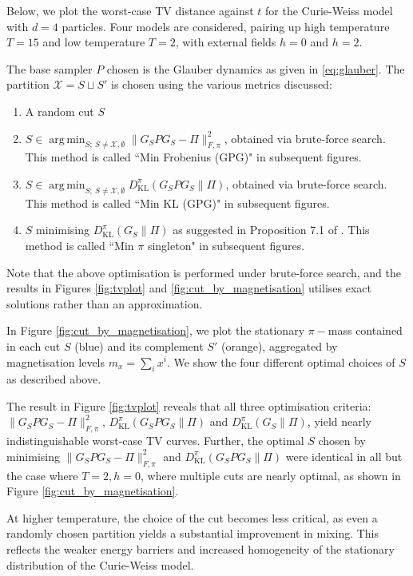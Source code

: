 \documentclass[EJP]{ejpecp} %
\DeclareMathOperator*{\argmin}{arg\,min}
\begin{document}
Below, we plot the worst-case TV distance against $t$ for the Curie-Weiss model with $d = 4$ particles. Four models are considered, pairing up high temperature $T = 15$ and low temperature $T = 2$, with external fields $h = 0$ and $h = 2$.

The base sampler $P$ chosen is the Glauber dynamics as given in \eqref{eq:glauber}. The partition $\mathcal{X} = S \sqcup S'$ is chosen using the various metrics discussed:
\begin{enumerate}
    \item A random cut $S$
    \item $S \in \argmin_{S;~S \neq \mathcal{X}, \emptyset} \|G_SPG_S - \Pi\|_{F, \pi}^2$, obtained via brute-force search. This method is called ``Min Frobenius (GPG)" in subsequent figures.
    \item $S \in \argmin_{S;~S \neq \mathcal{X}, \emptyset} D_{\mathrm{KL}}^\pi (G_SPG_S \| \Pi )$, obtained via brute-force search. This method is called ``Min KL (GPG)" in subsequent figures.
    \item $S$ minimising $D_{\mathrm{KL}}^\pi (G_S \| \Pi )$ as suggested in Proposition 7.1 of \cite{GPG}. This method is called ``Min $\pi$ singleton" in subsequent figures.
\end{enumerate}
Note that the above optimisation is performed under brute-force search, and the results in Figures \ref{fig:tvplot} and \ref{fig:cut_by_magnetisation} utilises exact solutions rather than an approximation. 

In Figure \ref{fig:cut_by_magnetisation}, we plot the stationary $\pi-$mass contained in each cut $S$ (blue) and its complement $S'$ (orange), aggregated by magnetisation levels $m_x = \sum_i x^i.$ We show the four different optimal choices of $S$ as described above.

The result in Figure \ref{fig:tvplot} reveals that all three optimisation criteria: $\|G_SPG_S - \Pi\|_{F, \pi}^2$, $D_{\mathrm{KL}}^\pi (G_SPG_S \| \Pi )$ and $D_{\mathrm{KL}}^\pi (G_S \| \Pi )$,
yield nearly indistinguishable worst-case TV curves. Further, the optimal $S$ chosen by minimising $\|G_SPG_S - \Pi\|_{F, \pi}^2$ and $D_{\mathrm{KL}}^\pi (G_SPG_S \| \Pi )$ were identical in all but the case where $T = 2, h = 0$, where multiple cuts are nearly optimal, as shown in Figure \ref{fig:cut_by_magnetisation}. 

At higher temperature, the choice of the cut becomes less critical, as even a randomly chosen partition yields a substantial improvement in mixing. This reflects the weaker energy barriers and increased homogeneity of the stationary distribution of the Curie-Weiss model.
\end{document}
